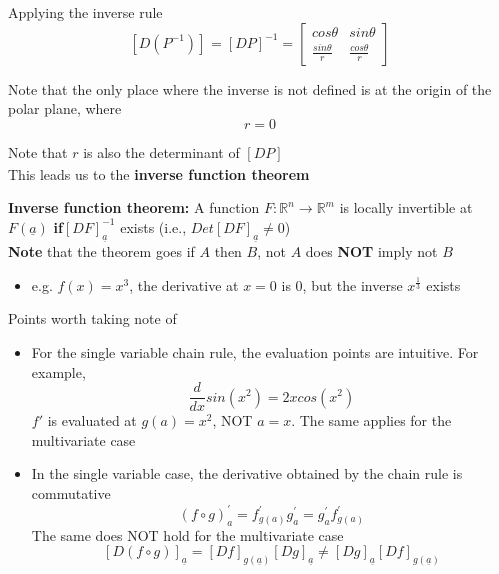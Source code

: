Applying the inverse rule
\[
   \left[ D (P^{-1}) \right]_{} = \left[ D P \right]_{} ^{-1} = \begin{bmatrix} 
      cos \theta & sin \theta \\ 
      \frac{sin \theta}{r} & \frac{cos \theta}{r}
   \end{bmatrix}
\] 

Note that the only place where the inverse is not defined is at the origin of the polar plane, where \[
  r = 0
\] 

Note that $r$ is also the determinant of $\left[ D P \right]_{} $ \\

This leads us to the \textbf{inverse function theorem}

\begin{framed}
   \textbf{Inverse function theorem:} A function $F: \mathbb{R}^n \to \mathbb{R}^m$ is locally invertible at $F ( \underline{a})$ \textbf{if}$\left[ D F \right]_{ \underline{a}}^{-1}$ exists (i.e., $Det \left[ D F \right]_{ \underline{a}} \neq 0$) \\

   \textbf{Note} that the theorem goes if $A$ then $B$, not $A$ does \textbf{NOT} imply not $B$
    \begin{itemize}
       \item e.g. $f(x) = x^3$, the derivative at  $x = 0$ is $0$, but the inverse $x^{ \frac{1}{3}}$ exists
   \end{itemize}
\end{framed}





\begin{framed}
Points worth taking note of
\begin{itemize}
   \item For the single variable chain rule, the evaluation points are intuitive. For example, \[
     \frac{d}{dx} sin(x^2) = 2x cos(x^2)
   \] 
   $f'$ is evaluated at $g(a) = x^2$, NOT $a = x$. The same applies for the multivariate case
   \item In the single variable case, the derivative obtained by the chain rule is commutative
      \[
   (f \circ g) ^{\prime}_{a} = f_{g(a)} ^{\prime} g_{a}^{\prime} = g_{a}^{\prime}f_{g(a)} ^{\prime}   
\] 
    The same does NOT hold for the multivariate case
\[
 \left[ D (f \circ g) \right]_{ \underline{a}}  = \left[ D f \right]_{g( \underline{a})}  \left[ D g \right]_{ \underline{a}}   \neq \left[ D g \right]_{ \underline{a} } \left[ D f \right]_{g ( \underline{a})} 
\] 
\end{itemize}
\end{framed}

